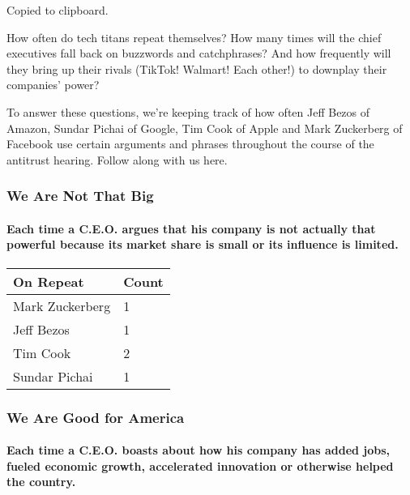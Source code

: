 Copied to clipboard.

How often do tech titans repeat themselves? How many times will the
chief executives fall back on buzzwords and catchphrases? And how
frequently will they bring up their rivals (TikTok! Walmart! Each
other!) to downplay their companies' power?

To answer these questions, we're keeping track of how often Jeff Bezos
of Amazon, Sundar Pichai of Google, Tim Cook of Apple and Mark
Zuckerberg of Facebook use certain arguments and phrases throughout the
course of the antitrust hearing. Follow along with us here.

\hypertarget{we-are-not-that-big}{%
\subsubsection{We Are Not That Big}\label{we-are-not-that-big}}

\hypertarget{each-time-a-ceo-argues-that-his-company-is-not-actually-that-powerful-because-its-market-share-is-small-or-its-influence-is-limited}{%
\paragraph{Each time a C.E.O. argues that his company is not actually
that powerful because its market share is small or its influence is
limited.}\label{each-time-a-ceo-argues-that-his-company-is-not-actually-that-powerful-because-its-market-share-is-small-or-its-influence-is-limited}}

\begin{longtable}[]{@{}ll@{}}
\toprule
\textbf{On Repeat} & \textbf{Count}\tabularnewline
\midrule
\endhead
Mark Zuckerberg & 1\tabularnewline
Jeff Bezos & 1\tabularnewline
Tim Cook & 2\tabularnewline
Sundar Pichai & 1\tabularnewline
\bottomrule
\end{longtable}

\hypertarget{we-are-good-for-america}{%
\subsubsection{We Are Good for America}\label{we-are-good-for-america}}

\hypertarget{each-time-a-ceo-boasts-about-how-his-company-has-added-jobs-fueled-economic-growth-accelerated-innovation-or-otherwise-helped-the-country}{%
\paragraph{Each time a C.E.O. boasts about how his company has added
jobs, fueled economic growth, accelerated innovation or otherwise helped
the
country.}\label{each-time-a-ceo-boasts-about-how-his-company-has-added-jobs-fueled-economic-growth-accelerated-innovation-or-otherwise-helped-the-country}}

